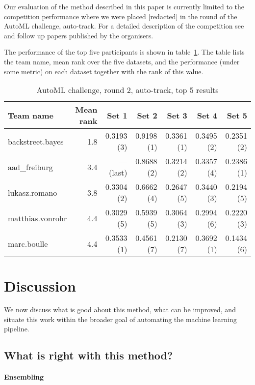 \documentclass{article} %
\begin{document}
Our evaluation of the method described in this paper is currently limited to the competition performance where we were placed [redacted] in the  round of the AutoML challenge, auto-track.
For a detailed description of the competition see  and follow up papers published by the organisers.

The performance of the top five participants is shown in table~\ref{table:automlresults}.
The table lists the team name, mean rank over the five datasets, and the performance (under some metric) on each dataset together with the rank of this value.

\begin{table}[ht]
  \center
  \begin{tabular}{|l|r|r|r|r|r|r|}
    \hline
    Team name & Mean rank & Set 1 & Set 2 & Set 3 & Set 4 & Set 5 \\
    \hline
    backstreet.bayes & 1.8 & 0.3193 (3) & 0.9198 (1) & 0.3361 (1) & 0.3495 (2) & 0.2351 (2)\\
    \hline
    aad\_freiburg    & 3.4 & --- (last) & 0.8688 (2) & 0.3214 (2) & 0.3357 (4) & 0.2386 (1) \\
    \hline
    lukasz.romano    & 3.8 & 0.3304 (2) & 0.6662 (4) & 0.2647 (5) & 0.3440 (3) & 0.2194 (5) \\
    \hline
    matthias.vonrohr & 4.4 & 0.3029 (5) & 0.5939 (5) & 0.3064 (3) & 0.2994 (6) & 0.2220 (3) \\
    \hline
    marc.boulle      & 4.4 & 0.3533 (1) & 0.4561 (7) & 0.2130 (7) & 0.3692 (1) & 0.1434 (6) \\
    \hline
  \end{tabular}
  \caption[AutoML results]{AutoML challenge, round 2, auto-track, top 5 results}
  \label{table:automlresults}
\end{table}

\section{Discussion}

We now discuss what is good about this method, what can be improved, and situate this work within the broader goal of automating the machine learning pipeline.

\subsection{What is right with this method?}

\paragraph{Ensembling}
\end{document}
